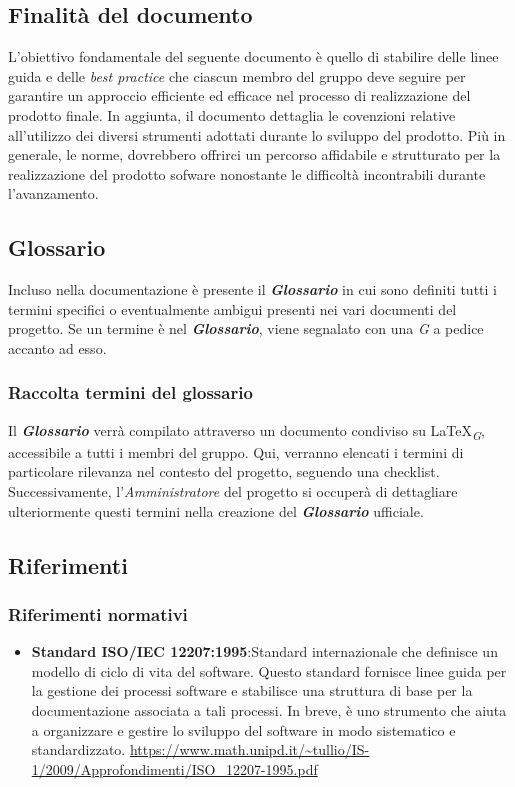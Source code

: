 \documentclass{article}
\begin{document}
\subsection{Finalità del documento}
L'obiettivo fondamentale del seguente documento è quello di stabilire delle linee guida e delle \textit{best practice} che ciascun membro del gruppo deve seguire per garantire un approccio efficiente ed efficace nel processo di realizzazione del prodotto finale. In aggiunta, il documento dettaglia le covenzioni relative all'utilizzo dei diversi strumenti adottati durante lo sviluppo del prodotto.
Più in generale, le norme, dovrebbero offrirci un percorso affidabile e strutturato per la realizzazione del prodotto sofware nonostante le difficoltà incontrabili durante l'avanzamento.

\subsection{Glossario}
Incluso nella documentazione è presente il \textbf{\textit{Glossario}} in cui sono definiti tutti i termini specifici o eventualmente ambigui presenti nei vari documenti del progetto. Se un termine è nel \textbf{\textit{Glossario}}, viene segnalato con una \textit{G} a pedice accanto ad esso.
\subsubsection{Raccolta termini del glossario}
Il \textbf{\textit{Glossario}} verrà compilato attraverso un documento condiviso su \LaTeX \textsubscript{\textit{G}}, accessibile a tutti i membri del gruppo. Qui, verranno elencati i termini di particolare rilevanza nel contesto del progetto, seguendo una checklist. Successivamente, l'\textit{Amministratore} del progetto si occuperà di dettagliare ulteriormente questi termini nella creazione del \textbf{\textit{Glossario}} ufficiale.

\subsection{Riferimenti}
\subsubsection{Riferimenti normativi}
\begin{itemize}
    \item \textbf{Standard ISO/IEC 12207:1995}:Standard internazionale che definisce un modello di ciclo di vita del software.
          Questo standard fornisce linee guida per la gestione dei processi software e stabilisce una struttura di base per la documentazione associata a tali processi.
          In breve, è uno strumento che aiuta a organizzare e gestire lo sviluppo del software in modo sistematico e standardizzato.
          \href{https://www.math.unipd.it/~tullio/IS-1/2009/Approfondimenti/ISO_12207-1995.pdf}{\url{https://www.math.unipd.it/~tullio/IS-1/2009/Approfondimenti/ISO_12207-1995.pdf}}

\end{itemize}
\end{document}

